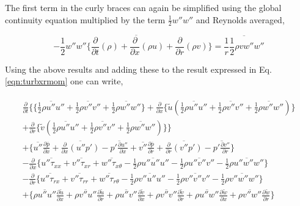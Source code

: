 	The first term in the curly braces can again be simplified using the global continuity equation multiplied by
the term $\frac{1}{2}w''w''$ and Reynolds averaged,

\begin{displaymath}
	 -\overline{\frac{1}{2}w''w''\Big\{\frac{\partial}{\partial t}(\rho) + \frac{\partial}{\partial x}(\rho u)
	+ \frac{\partial}{\partial r}(\rho v)\Big\}} = \overline{\frac{1}{r}\frac{1}{2} \rho v w'' w''}
\end{displaymath}

	Using the above results and adding these to the result expressed in Eq. \ref{eqn:turbxrmom} one can write,

\begin{equation}
  \begin{array}{ccc}
   \begin{array}{c}
	\frac{\partial}{\partial t}\Bigg\{\Big\{\overline{\frac{1}{2}\rho u'' u''} + \overline{\frac{1}{2}\rho v'' v''} 
	+\overline{\frac{1}{2}\rho w'' w''} \Big\}	
	+\frac{\partial}{\partial x}\Big\{\tilde u (\overline{\frac{1}{2}\rho u'' u''} 
	+ \overline{\frac{1}{2}\rho v'' v''} + \overline{\frac{1}{2}\rho w'' w''} )\Big\} \\
	+\frac{\partial}{\partial r}\Big\{\tilde v (\overline{\frac{1}{2}\rho u'' u''} 
	+ \overline{\frac{1}{2}\rho v'' v''} + \overline{\frac{1}{2}\rho w'' w''} )\Big\} \Bigg\}\\

	+ \Big\{ \overline{u''}\frac{\partial \overline{p}}{\partial x} + \overline{\frac{\partial}{\partial x}(u''p')} 
	- \overline {p'\frac{\partial u''}{\partial x}} + \overline{v''}\frac{\partial \overline{p}}{\partial r} + 
	\overline{\frac{\partial}{\partial r}(v''p')} - \overline {p'\frac{\partial v''}{\partial r}} \Big\} \\

	-\frac{\partial}{\partial x}\Big\{ \overline{u''\tau_{xx}} + \overline{v''\tau_{xr}} + \overline{w''\tau_{x\theta}}
	- \frac{1}{2}\overline{\rho u'' u'' u''} - \frac{1}{2}\overline{\rho u'' v'' v''} 
	- \frac{1}{2}\overline{\rho u'' w'' w''}\Big\} \\

	-\frac{\partial}{\partial r}\Big\{ \overline{u''\tau_{rx}} +  \overline{v''\tau_{rr}} + \overline{w''\tau_{r\theta}} 
	- \frac{1}{2}\overline{\rho v'' u'' u''} - \frac{1}{2}\overline{\rho v'' v'' v''}  
	- \frac{1}{2}\overline{\rho v'' w'' w''}\Big\} \\

	+ \Big\{\overline{\rho u'' u''}\frac{\partial \tilde u}{\partial x} + \overline{\rho v'' u''}  
	\frac{\partial \tilde u}{\partial r} + \overline{\rho u'' v''}\frac{\partial \tilde v}{\partial x}
	+ \overline{\rho v'' v''}\frac{\partial \tilde v}{\partial r} + \overline{\rho u'' w''}
	\frac{\partial \tilde w}{\partial x}+ \overline{\rho v'' w''}\frac{\partial \tilde w}{\partial r} \Big\} \\


\end{array}
\end{array}
\end{equation}
